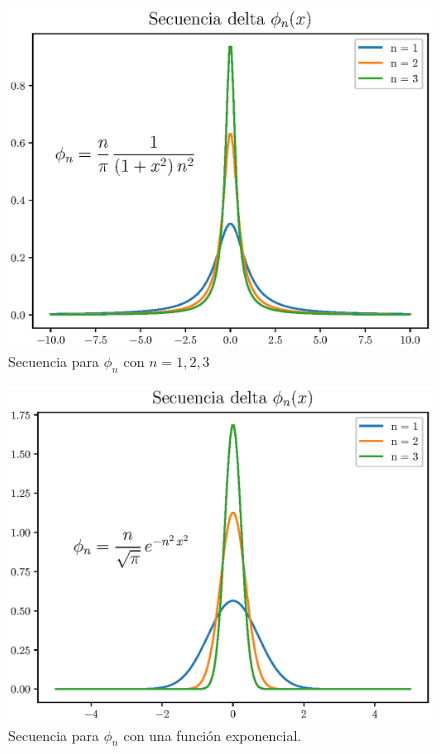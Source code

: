 \begin{figure}[H]
    \centering
    \includegraphics[scale=0.8]{Imagenes/secuencia_delta_01.eps}
    \caption{Secuencia para $\phi_{n}$ con $n=1,2,3$}
    \label{fig:plot_secuencia_01}
\end{figure}


\begin{figure}[H]
    \centering
    \includegraphics[scale=0.8]{Imagenes/secuencia_delta_02.eps}
    \caption{Secuencia para $\phi_{n}$ con una función exponencial.}
    \label{fig:plot_secuencia_02}
\end{figure}

